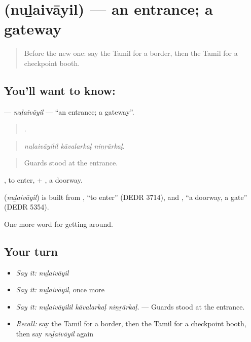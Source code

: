 \section[\texorpdfstring{\ta{நுழைவாயில்} (nuḻaivāyil)}{நுழைவாயில் (nuḻaivāyil)}]{ (nuḻaivāyil) — an entrance; a gateway}

\label{lesson:TA-C414-nulaivayil}



\begin{quote}
Before the new one: say the Tamil for a border, then the Tamil for a checkpoint booth.
\end{quote}

\subsection*{You'll want to know: }
\textbf{} — \emph{nuḻaivāyil} — \textquotedblleft{}an entrance; a gateway\textquotedblright{}.

\begin{quote}
  .
\end{quote}

\begin{quote}
\emph{nuḻaivāyilil kāvalarkaḷ niṉṟārkaḷ.}
\end{quote}

\begin{quote}
Guards stood at the entrance.
\end{quote}

, to enter, + , a doorway.

\begin{cousinweb}
\textbf{} (\emph{nuḻaivāyil}) is built from , \textquotedblleft{}to enter\textquotedblright{} (DEDR 3714), and , \textquotedblleft{}a doorway, a gate\textquotedblright{} (DEDR 5354).
\end{cousinweb}

\begin{grammarlens}[title={What you've built}]
One more word for getting around.
\end{grammarlens}

\subsection*{Your turn}
\begin{itemize}
\raggedright
  \item \emph{Say it:} \emph{nuḻaivāyil}
  \item \emph{Say it:} \emph{nuḻaivāyil}, once more
  \item \emph{Say it:} \emph{nuḻaivāyilil kāvalarkaḷ niṉṟārkaḷ.} — Guards stood at the entrance.
  \item \emph{Recall:} say the Tamil for a border, then the Tamil for a checkpoint booth, then say \emph{nuḻaivāyil} again
\end{itemize}

